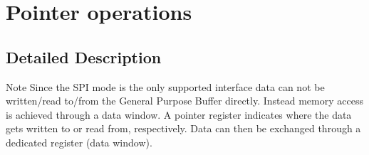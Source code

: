 \hypertarget{group__pointers}{}\section{Pointer operations}
\label{group__pointers}


\subsection{Detailed Description}
\begin{DoxyNote}{Note}
Since the S\+PI mode is the only supported interface data can not be written/read to/from the General Purpose Buffer directly. Instead memory access is achieved through a data window. A pointer register indicates where the data gets written to or read from, respectively. Data can then be exchanged through a dedicated register (data window). 
\end{DoxyNote}
